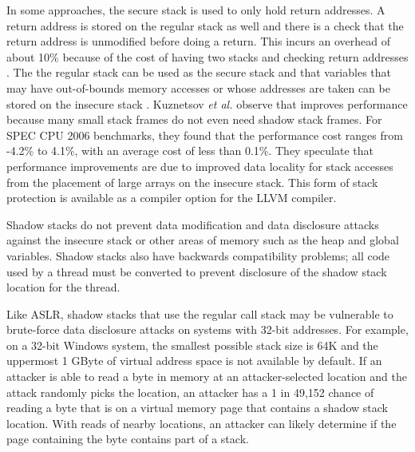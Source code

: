 In some approaches, the secure stack is used to only hold return addresses.
A return address is stored on the regular stack as well and there is a
check that the return address is unmodified before doing a return.
This incurs an overhead of about 10\% because of the cost of having two
stacks and checking return addresses \cite{Dang2015}.   The
the regular stack can be used as the secure stack and that variables
that may have out-of-bounds memory accesses or whose addresses are taken
can be stored on the insecure stack \cite{Bhatkar2005, Kuznetsov2014}.  
Kuznetsov {\it et al.}
\cite{Kuznetsov2014} observe that improves performance because
many small stack frames do not even need shadow stack frames.  For
SPEC CPU 2006 benchmarks, they found that the performance cost 
ranges from -4.2\% to 4.1\%,
with an average cost of less than 0.1\%.  They speculate
that performance improvements are due to improved data locality for
stack accesses from the placement of large arrays on the insecure stack.
This form of stack protection is available as a compiler option 
for the LLVM compiler.

Shadow stacks do not prevent data modification and data disclosure attacks
against the insecure stack or other areas of memory such as the heap 
and global variables.  Shadow stacks also have backwards compatibility
problems; all code used by a thread must be converted to prevent disclosure
of the shadow stack location for the thread.  

Like ASLR, shadow stacks that use the regular call stack may be vulnerable to 
brute-force data disclosure attacks on systems with 32-bit addresses.
For example, on a 32-bit Windows system, the smallest possible
stack size is 64K and the uppermost 1 GByte of virtual address space
is not available by default.  If an attacker is able to read a byte 
in memory at an attacker-selected location and the attack randomly picks
the location,  an attacker has a 1 in 49,152 
chance of reading a byte that is on a virtual memory page that contains a 
shadow stack location.  With reads of nearby locations, an attacker can likely 
determine if the page containing the byte contains part of a stack.  

